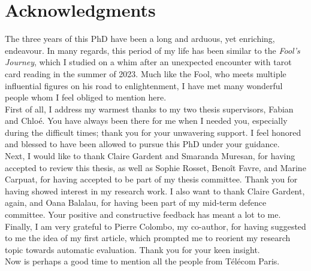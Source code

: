 \chapter*{Acknowledgments}

\begin{otherlanguage}{french}
\end{otherlanguage}

The three years of this PhD have been a long and arduous, yet enriching, endeavour. In many regards, this period of my life has been similar to the \emph{Fool's Journey}, which I studied on a whim after an unexpected encounter with tarot card reading in the summer of 2023. Much like the Fool, who meets multiple influential figures on his road to enlightenment, I have met many wonderful people whom I feel obliged to mention here.\\

First of all, I address my warmest thanks to my two thesis supervisors, Fabian and Chloé. You have always been there for me when I needed you, especially during the difficult times; thank you for your unwavering support. I feel honored and blessed to have been allowed to pursue this PhD under your guidance.\\

Next, I would like to thank Claire Gardent and Smaranda Muresan, for having accepted to review this thesis, as well as Sophie Rosset, Benoît Favre, and Marine Carpuat, for having accepted to be part of my thesis committee. Thank you for having showed interest in my research work. I also want to thank Claire Gardent, again, and Oana Balalau, for having been part of my mid-term defence committee. Your positive and constructive feedback has meant a lot to me. Finally, I am very grateful to Pierre Colombo, my co-author, for having suggested to me the idea of my first article, which prompted me to reorient my research topic towards automatic evaluation. Thank you for your keen insight.\\

Now is perhaps a good time to mention all the people from Télécom Paris.\\


